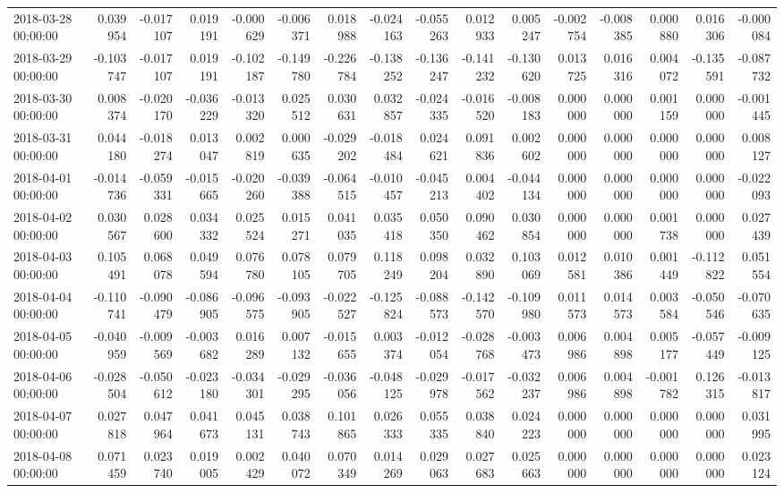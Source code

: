\begin{tabular}{lrrrrrrrrrrrrrrr}
2018-03-28 00:00:00 & 0.039954 & -0.017107 & 0.019191 & -0.000629 & -0.006371 & 0.018988 & -0.024163 & -0.055263 & 0.012933 & 0.005247 & -0.002754 & -0.008385 & 0.000880 & 0.016306 & -0.000084 \\
2018-03-29 00:00:00 & -0.103747 & -0.017107 & 0.019191 & -0.102187 & -0.149780 & -0.226784 & -0.138252 & -0.136247 & -0.141232 & -0.130620 & 0.013725 & 0.016316 & 0.004072 & -0.135591 & -0.087732 \\
2018-03-30 00:00:00 & 0.008374 & -0.020170 & -0.036229 & -0.013320 & 0.025512 & 0.030631 & 0.032857 & -0.024335 & -0.016520 & -0.008183 & 0.000000 & 0.000000 & 0.001159 & 0.000000 & -0.001445 \\
2018-03-31 00:00:00 & 0.044180 & -0.018274 & 0.013047 & 0.002819 & 0.000635 & -0.029202 & -0.018484 & 0.024621 & 0.091836 & 0.002602 & 0.000000 & 0.000000 & 0.000000 & 0.000000 & 0.008127 \\
2018-04-01 00:00:00 & -0.014736 & -0.059331 & -0.015665 & -0.020260 & -0.039388 & -0.064515 & -0.010457 & -0.045213 & 0.004402 & -0.044134 & 0.000000 & 0.000000 & 0.000000 & 0.000000 & -0.022093 \\
2018-04-02 00:00:00 & 0.030567 & 0.028600 & 0.034332 & 0.025524 & 0.015271 & 0.041035 & 0.035418 & 0.050350 & 0.090462 & 0.030854 & 0.000000 & 0.000000 & 0.001738 & 0.000000 & 0.027439 \\
2018-04-03 00:00:00 & 0.105491 & 0.068078 & 0.049594 & 0.076780 & 0.078105 & 0.079705 & 0.118249 & 0.098204 & 0.032890 & 0.103069 & 0.012581 & 0.010386 & 0.001449 & -0.112822 & 0.051554 \\
2018-04-04 00:00:00 & -0.110741 & -0.090479 & -0.086905 & -0.096575 & -0.093905 & -0.022527 & -0.125824 & -0.088573 & -0.142570 & -0.109980 & 0.011573 & 0.014573 & 0.003584 & -0.050546 & -0.070635 \\
2018-04-05 00:00:00 & -0.040959 & -0.009569 & -0.003682 & 0.016289 & 0.007132 & -0.015655 & 0.003374 & -0.012054 & -0.028768 & -0.003473 & 0.006986 & 0.004898 & 0.005177 & -0.057449 & -0.009125 \\
2018-04-06 00:00:00 & -0.028504 & -0.050612 & -0.023180 & -0.034301 & -0.029295 & -0.036056 & -0.048125 & -0.029978 & -0.017562 & -0.032237 & 0.006986 & 0.004898 & -0.001782 & 0.126315 & -0.013817 \\
2018-04-07 00:00:00 & 0.027818 & 0.047964 & 0.041673 & 0.045131 & 0.038743 & 0.101865 & 0.026333 & 0.055335 & 0.038840 & 0.024223 & 0.000000 & 0.000000 & 0.000000 & 0.000000 & 0.031995 \\
2018-04-08 00:00:00 & 0.071459 & 0.023740 & 0.019005 & 0.002429 & 0.040072 & 0.070349 & 0.014269 & 0.029063 & 0.027683 & 0.025663 & 0.000000 & 0.000000 & 0.000000 & 0.000000 & 0.023124 \\

\end{tabular}
